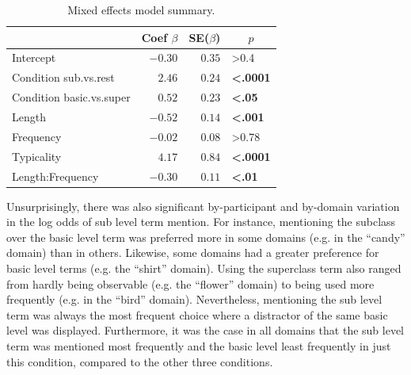 \documentclass[10pt,letterpaper]{article}
\newcommand{\figref}[1]{Fig.~\ref{#1}}
\begin{document}
\begin{table}[tbp]
\caption{Mixed effects model summary.}
\begin{center}
\begin{tabular}{lrrl}
\toprule
\multicolumn{1}{l}{}&\multicolumn{1}{c}{Coef $\beta$}&\multicolumn{1}{c}{SE($\beta$)}&\multicolumn{1}{c}{$p$}\tabularnewline
\midrule
Intercept&$-0.30$&$0.35$&\textgreater0.4\tabularnewline
Condition sub.vs.rest&$ 2.46$&$0.24$&\textbf{\textless.0001}\tabularnewline
Condition basic.vs.super&$ 0.52$&$0.23$&\textbf{\textless.05}\tabularnewline
Length&$-0.52$&$0.14$&\textbf{\textless.001}\tabularnewline
Frequency&$-0.02$&$0.08$&\textgreater0.78\tabularnewline
Typicality&$ 4.17$&$0.84$&\textbf{\textless.0001}\tabularnewline
Length:Frequency&$-0.30$&$0.11$&\textbf{\textless.01}\tabularnewline
\bottomrule
\end{tabular}\end{center}
\label{tab:modelresults}
\end{table}





%


Unsurprisingly, there was also significant by-participant and by-domain variation in the log odds of sub level term mention. %
For instance, mentioning the subclass over the basic level term was preferred more in some domains (e.g. in the ``candy'' domain) than in others. Likewise, some domains had a greater preference for basic level terms (e.g. the ``shirt'' domain). Using the superclass term also ranged from hardly being observable (e.g. the ``flower'' domain) to being used more frequently (e.g. in the ``bird'' domain). Nevertheless, mentioning the sub level term was always the most frequent choice where a distractor of the same basic level was displayed. Furthermore, it was the case in all domains that the sub level term was mentioned most frequently and the basic level least frequently in just this condition, compared to the other three conditions.
\end{document}
